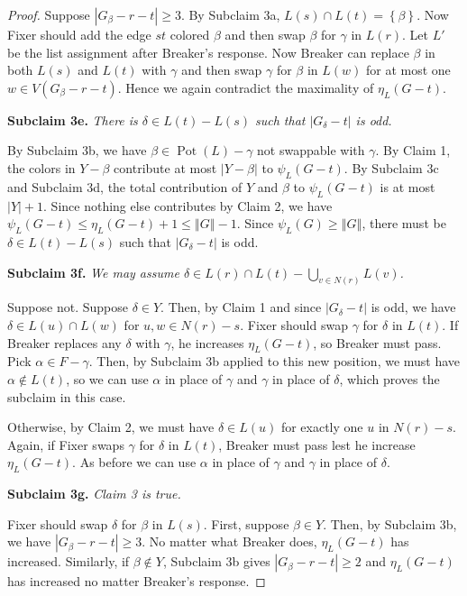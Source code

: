 \documentclass[12pt,reqno]{amsart}
\theoremstyle{plain}
\theoremstyle{definition}
\theoremstyle{remark}
\newcommand{\set}[1]{\left\{ #1 \right\}}
\newcommand{\card}[1]{\left|#1\right|}
\newcommand{\size}[1]{\left\Vert#1\right\Vert}
\newcommand{\pot}{\operatorname{Pot}}
\begin{document}
\begin{proof}
Suppose $\card{G_\beta - r - t} \ge 3$.  By Subclaim 3a, $L(s) \cap L(t) = \set{\beta}$. Now Fixer should add the edge $st$ colored $\beta$ and then swap $\beta$ for $\gamma$ in $L(r)$. Let $L'$ be the list assignment after Breaker's response.   Now Breaker can replace $\beta$ in both $L(s)$ and $L(t)$ with $\gamma$ and then swap $\gamma$ for $\beta$ in $L(w)$ for at most one $w \in V(G_\beta - r - t)$.  Hence we again contradict the maximality of $\eta_L(G - t)$.

\noindent\textbf{Subclaim 3e.  }\textit{There is $\delta \in L(t) - L(s)$ such that $\card{G_\delta - t}$ is odd.}

By Subclaim 3b, we have $\beta \in \pot(L) - \gamma$ not swappable with $\gamma$.   By Claim 1, the colors in $Y - \beta$ contribute at most $|Y - \beta|$ to $\psi_L(G - t)$.  By Subclaim 3c and Subclaim 3d, the total contribution of $Y$ and $\beta$ to $\psi_L(G - t)$ is at most $\card{Y} + 1$.  Since nothing else contributes by Claim 2, we have $\psi_L(G - t) \le \eta_L(G - t) + 1 \le \size{G} - 1$.  Since $\psi_L(G) \ge \size{G}$, there must be $\delta \in L(t) - L(s)$ such that $\card{G_\delta - t}$ is odd.

\noindent\textbf{Subclaim 3f.  }\textit{We may assume $\delta \in L(r) \cap L(t) - \bigcup_{v \in N(r)} L(v)$.}

Suppose not.  Suppose $\delta \in Y$. Then, by Claim 1 and since $\card{G_\delta - t}$ is odd, we have $\delta \in L(u) \cap L(w)$ for $u,w \in N(r) - s$.  Fixer should swap $\gamma$ for $\delta$ in $L(t)$.  If Breaker replaces any $\delta$ with $\gamma$, he increases $\eta_L(G - t)$, so Breaker must pass.  Pick $\alpha \in F - \gamma$.  Then, by Subclaim 3b applied to this new position, we must have $\alpha \not \in L(t)$, so we can use $\alpha$ in place of $\gamma$ and $\gamma$ in place of $\delta$, which proves the subclaim in this case.

Otherwise, by Claim 2, we must have $\delta \in L(u)$ for exactly one $u$ in $N(r) - s$.  Again, if Fixer swaps $\gamma$ for $\delta$ in $L(t)$, Breaker must pass lest he increase $\eta_L(G - t)$.  As before we  can use $\alpha$ in place of $\gamma$ and $\gamma$ in place of $\delta$.

\noindent\textbf{Subclaim 3g.  }\textit{Claim 3 is true.}

Fixer should swap $\delta$ for $\beta$ in $L(s)$.  First, suppose $\beta \in Y$.  Then, by Subclaim 3b, we have $\card{G_\beta - r - t} \ge 3$.  No matter what Breaker does, $\eta_L(G-t)$ has increased.  Similarly, if $\beta \not \in Y$, Subclaim 3b gives $\card{G_\beta - r - t} \ge 2$ and $\eta_L(G-t)$ has increased no matter Breaker's response.



\end{proof}
\end{document}

